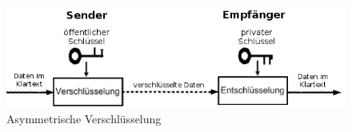 %
\begin{figure}[ht]
\begin{center}
\includegraphics[width=15cm]{images/asymmetrischeVerschluesselung.png}
\caption{Asymmetrische Verschlüsselung}
\end{center}
\end{figure}
%


